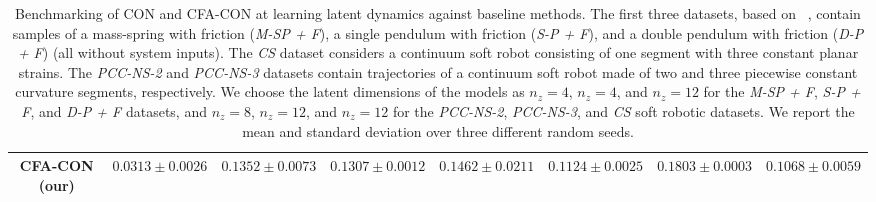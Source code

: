 \begin{landscape}
\begin{table}
\begin{small}
\begin{tabular}{c c c c c c c c}
         CFA-CON (our) & $0.0313 \pm 0.0026$ & $0.1352 \pm 0.0073$ & $\mathbf{0.1307 \pm 0.0012}$ & $0.1462 \pm 0.0211$ & $0.1124 \pm 0.0025$ & $0.1803 \pm 0.0003$ & $0.1068 \pm 0.0059$\\
         \bottomrule
    \end{tabular}
    \end{small}
    \caption{Benchmarking of \gls{CON} and \gls{CFA-CON} at learning latent dynamics against baseline methods. 
    The first three datasets, based on ~\cite{botev2021priors}, contain samples of a mass-spring with friction (\emph{M-SP + F}), a single pendulum with friction (\emph{S-P + F}), and a double pendulum with friction (\emph{D-P + F}) (all without system inputs).
    The \emph{CS} dataset considers a continuum soft robot consisting of one segment with three constant planar strains. The \emph{PCC-NS-2} and \emph{PCC-NS-3} datasets contain trajectories of a continuum soft robot made of two and three piecewise constant curvature segments, respectively.
    We choose the latent dimensions of the models as $n_z = 4$, $n_z = 4$, and $n_z = 12$ for the \emph{M-SP + F}, \emph{S-P + F}, and \emph{D-P + F} datasets, and  $n_z = 8$, $n_z = 12$, and $n_z = 12$ for the \emph{PCC-NS-2}, \emph{PCC-NS-3}, and \emph{CS} soft robotic datasets.
    We report the mean and standard deviation over three different random seeds.}
    \label{tab:con:latent_dynamics_results}
\end{table}


\end{landscape}
